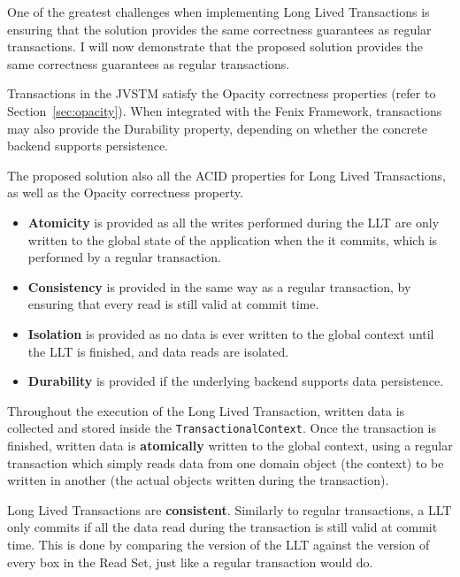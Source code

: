 One of the greatest challenges when implementing Long Lived Transactions
is ensuring that the solution provides the same correctness guarantees
as regular transactions. I will now demonstrate that the proposed
solution provides the same correctness guarantees as regular transactions.

Transactions in the JVSTM satisfy the Opacity correctness properties
(refer to Section~\ref{sec:opacity}). When integrated with the Fenix
Framework, transactions may also provide the Durability property,
depending on whether the concrete backend supports persistence.

The proposed solution also all the ACID properties for Long
Lived Transactions, as well as the Opacity correctness property.

\begin{itemize}

\item {\bf Atomicity} is provided as all the writes performed during
  the LLT are only written to the global state of the application when
  the it commits, which is performed by a regular transaction.

\item {\bf Consistency} is provided in the same way as a regular
  transaction, by ensuring that every read is still valid at commit
  time.

\item {\bf Isolation} is provided as no data is ever written to the
  global context until the LLT is finished, and data reads are isolated.

\item {\bf Durability} is provided if the underlying backend supports
  data persistence.

\end{itemize}

Throughout the execution of the Long Lived Transaction, written data
is collected and stored inside the \texttt{TransactionalContext}. Once
the transaction is finished, written data is {\bf atomically} written
to the global context, using a regular transaction which simply reads
data from one domain object (the context) to be written in another
(the actual objects written during the transaction).

Long Lived Transactions are {\bf consistent}. Similarly to regular
transactions, a LLT only commits if all the data read during the
transaction is still valid at commit time. This is done by comparing
the version of the LLT against the version of every box in the Read
Set, just like a regular transaction would do.

